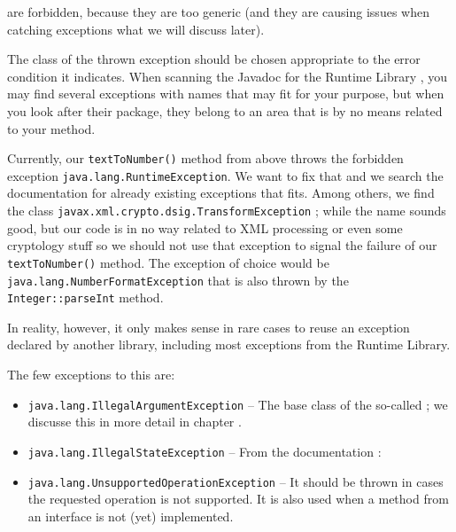 are forbidden, because they are too generic (and they are causing issues when catching exceptions what we will discuss later).

The class of the thrown exception should be chosen appropriate to the error condition it indicates. When scanning the Javadoc for the \Java Runtime Library \autocite{ORACLE_DOC_OVERVIEW}, you may find several exceptions with names that may fit for your purpose, but when you look after their package, they belong to an area that is by no means related to your method.

Currently, our \lstinline|textToNumber()| method from above throws the forbidden exception \lstinline|java.lang.RuntimeException|. We want to fix that and we search the documentation for already existing exceptions that fits. Among others, we find the class \lstinline|javax.xml.crypto.dsig.TransformException| \autocite{ORACLE_DOC_TRANSFORMEXCEPTION_CLASS}; while the name  sounds good, but our code is in no way related to XML processing or even some cryptology stuff so we should not use that exception to signal the failure of our \lstinline|textToNumber()| method. The exception of choice would be \lstinline|java.lang.NumberFormatException| \autocite{ORACLE_DOC_NUMBERFORMATEXCEPTION_CLASS} that is also thrown by the \lstinline|Integer::parseInt| method.

In reality, however, it only makes sense in rare cases to reuse an exception declared by another library, including most exceptions from the \Java Runtime Library.

The few exceptions to this are:
\begin{itemize}
	\item{\lstinline|java.lang.IllegalArgumentException| \autocite{ORACLE_DOC_ILLEGALARGUMENTEXCEPTION_CLASS} – The base class of the so-called ; we discusse this in more detail in chapter .}
	
	\item{\lstinline|java.lang.IllegalStateException|  – From the documentation \autocite{ORACLE_DOC_ILLEGALSTATEEXCEPTION_CLASS}: }

	\item{\lstinline|java.lang.UnsupportedOperationException| \autocite{ORACLE_DOC_UNSUPPORTEDOPERATIONEXCEPTION_CLASS} – It should be thrown in cases the requested operation is not supported. It is also used when a method from an interface is not (yet) implemented.}
\end{itemize}

